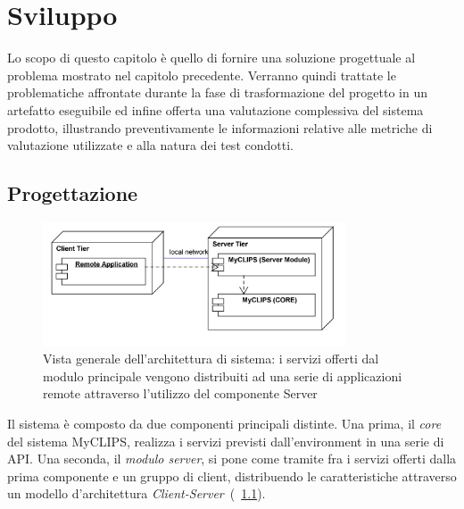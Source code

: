 \chapter{Sviluppo}

Lo scopo di questo capitolo è quello di fornire una soluzione progettuale al problema mostrato nel capitolo precedente. Verranno quindi trattate le problematiche affrontate durante la fase di trasformazione del progetto in un artefatto eseguibile ed infine offerta una valutazione complessiva del sistema prodotto, illustrando preventivamente le informazioni relative alle metriche di valutazione utilizzate e alla natura dei test condotti.

\section{Progettazione}

\begin{figure}[h]
\centering
\includegraphics[width=0.8\textwidth]{Immagini/Capitolo3/Deployment/Client-Server.png}
\caption[Vista generale dell'architettura di sistema]{Vista generale dell'architettura di sistema: i servizi offerti dal modulo principale vengono distribuiti ad una serie di applicazioni remote attraverso l'utilizzo del componente Server}\label{fig:architettura-client-server}
\end{figure}

Il sistema è composto da due componenti principali distinte. Una prima, il \emph{core} del sistema MyCLIPS, realizza i servizi previsti dall'environment in una serie di API. Una seconda, il \emph{modulo server}, si pone come tramite fra i servizi offerti dalla prima componente e un gruppo di client, distribuendo le caratteristiche attraverso un modello d'architettura \emph{Client-Server}~(\figurename~\ref{fig:architettura-client-server}).

